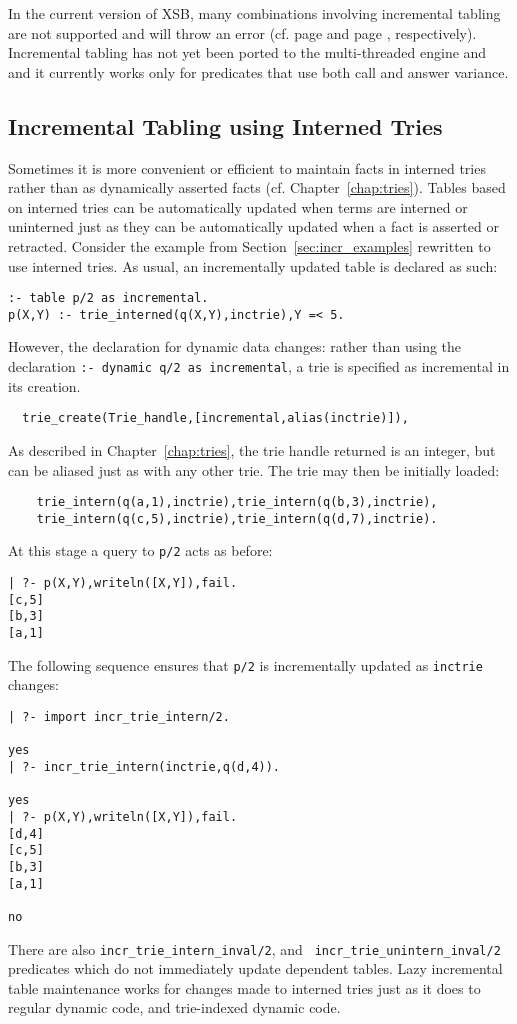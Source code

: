 In the current version of XSB, many combinations involving incremental
tabling are not supported and will throw an error (cf. page
\pageref{table-declaration} and page \pageref{dynamic-declaration},
respectively). Incremental tabling has not yet been ported to the
multi-threaded engine and and it currently works only for predicates
that use both call and answer variance.

\subsection{Incremental Tabling using Interned Tries} \label{sec:incr-update-tries}
%
Sometimes it is more convenient or efficient to maintain facts in
interned tries rather than as dynamically asserted facts
(cf. Chapter~\ref{chap:tries}).  Tables based on interned tries can be
automatically updated when terms are interned or uninterned just as
they can be automatically updated when a fact is asserted or
retracted.  Consider the example from Section~\ref{sec:incr_examples}
rewritten to use interned tries.  As usual, an incrementally updated
table is declared as such:
%
\begin{verbatim}
:- table p/2 as incremental.
p(X,Y) :- trie_interned(q(X,Y),inctrie),Y =< 5.
\end{verbatim}
%
However, the declaration for dynamic data changes: rather than using
the declaration {\tt :- dynamic q/2 as incremental}, a trie is
specified as incremental in its creation.
%
\begin{verbatim}
  trie_create(Trie_handle,[incremental,alias(inctrie)]),
\end{verbatim}
%
As described in Chapter~\ref{chap:tries}, the trie handle returned is
an integer, but can be aliased just as with any other trie.  The trie
may then be initially loaded:
%
\begin{verbatim}
	trie_intern(q(a,1),inctrie),trie_intern(q(b,3),inctrie),
	trie_intern(q(c,5),inctrie),trie_intern(q(d,7),inctrie).
\end{verbatim}
%
At this stage a query to {\tt p/2} acts as before:
%
\begin{verbatim}
| ?- p(X,Y),writeln([X,Y]),fail.
[c,5]
[b,3]
[a,1]
\end{verbatim}
%
The following sequence ensures that {\tt p/2} is incrementally updated
as {\tt inctrie} changes:
%
\begin{verbatim}
| ?- import incr_trie_intern/2.

yes
| ?- incr_trie_intern(inctrie,q(d,4)).

yes
| ?- p(X,Y),writeln([X,Y]),fail.
[d,4]
[c,5]
[b,3]
[a,1]

no
\end{verbatim}
%
There are also {\tt incr\_trie\_intern\_inval/2}, and {\tt
  incr\_trie\_unintern\_inval/2} predicates which do not immediately
update dependent tables.  Lazy incremental table maintenance works for
changes made to interned tries just as it does to regular dynamic
code, and trie-indexed dynamic code.


